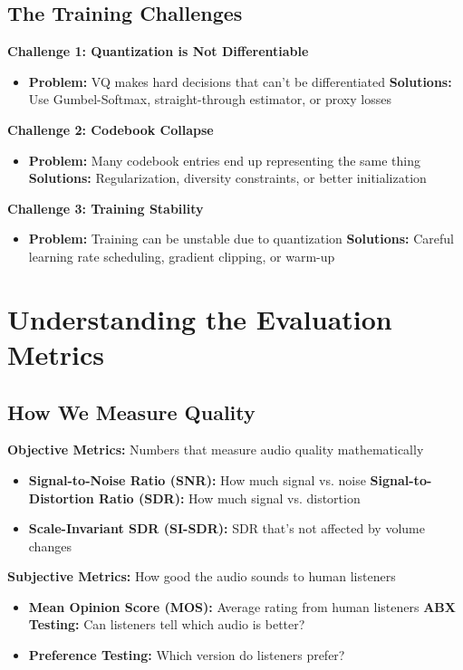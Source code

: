 \documentclass[12pt]{article}
\begin{document}
\subsection{The Training Challenges}

\textbf{Challenge 1: Quantization is Not Differentiable}
\begin{itemize}
    \item \textbf{Problem:} VQ makes hard decisions that can't be differentiated
    \textbf{Solutions:} Use Gumbel-Softmax, straight-through estimator, or proxy losses
\end{itemize}

\textbf{Challenge 2: Codebook Collapse}
\begin{itemize}
    \item \textbf{Problem:} Many codebook entries end up representing the same thing
    \textbf{Solutions:} Regularization, diversity constraints, or better initialization
\end{itemize}

\textbf{Challenge 3: Training Stability}
\begin{itemize}
    \item \textbf{Problem:} Training can be unstable due to quantization
    \textbf{Solutions:} Careful learning rate scheduling, gradient clipping, or warm-up
\end{itemize}

\section{Understanding the Evaluation Metrics}

\subsection{How We Measure Quality}

\textbf{Objective Metrics:} Numbers that measure audio quality mathematically
\begin{itemize}
    \item \textbf{Signal-to-Noise Ratio (SNR):} How much signal vs. noise
    \textbf{Signal-to-Distortion Ratio (SDR):} How much signal vs. distortion
    \item \textbf{Scale-Invariant SDR (SI-SDR):} SDR that's not affected by volume changes
\end{itemize}

\textbf{Subjective Metrics:} How good the audio sounds to human listeners
\begin{itemize}
    \item \textbf{Mean Opinion Score (MOS):} Average rating from human listeners
    \textbf{ABX Testing:} Can listeners tell which audio is better?
    \item \textbf{Preference Testing:} Which version do listeners prefer?
\end{itemize}
\end{document}
